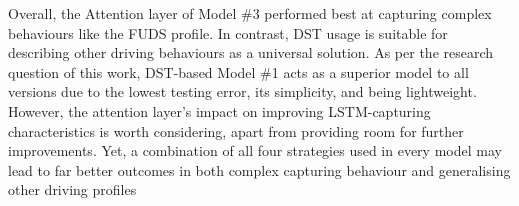 %
%
Overall, the Attention layer of Model \#3 performed best at capturing complex behaviours like the FUDS profile.
In contrast, DST usage is suitable for describing other driving behaviours as a universal solution.
As per the research question of this work, DST-based Model \#1 acts as a superior model to all versions due to the lowest testing error, its simplicity, and being lightweight.
However, the attention layer's impact on improving LSTM-capturing characteristics is worth considering, apart from providing room for further improvements.
Yet, a combination of all four strategies used in every model may lead to far better outcomes in both complex capturing behaviour and generalising other driving profiles

%
%

%
%

%

%
%

